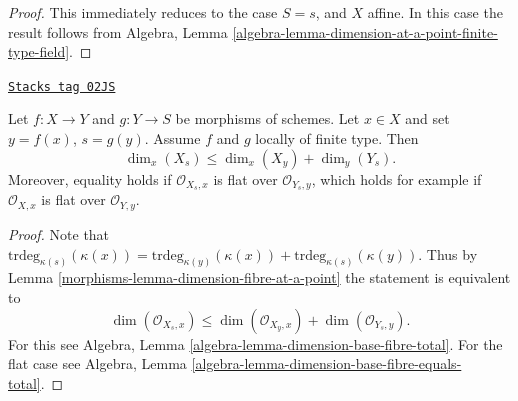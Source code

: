 \begin{proof}
This immediately reduces to the case $S = s$, and $X$ affine.
In this case the result follows from
Algebra, Lemma \ref{algebra-lemma-dimension-at-a-point-finite-type-field}.
\end{proof}

\begin{lemma}
\label{morphisms-lemma-dimension-fibre-at-a-point-additive}
\href{https://stacks.math.columbia.edu/tag/02JS}{\texttt{Stacks tag 02JS}}

Let $f : X \to Y$ and $g : Y \to S$ be morphisms of schemes.
Let $x \in X$ and set $y = f(x)$, $s = g(y)$.
Assume $f$ and $g$ locally of finite type.
Then
$$
\dim_x(X_s) \leq \dim_x(X_y) + \dim_y(Y_s).
$$
Moreover, equality holds if $\mathcal{O}_{X_s, x}$ is flat
over $\mathcal{O}_{Y_s, y}$, which holds for example if $\mathcal{O}_{X, x}$
is flat over $\mathcal{O}_{Y, y}$.
\end{lemma}

\begin{proof}

Note that $\text{trdeg}_{\kappa(s)}(\kappa(x)) =
\text{trdeg}_{\kappa(y)}(\kappa(x)) + \text{trdeg}_{\kappa(s)}(\kappa(y))$.
Thus by Lemma \ref{morphisms-lemma-dimension-fibre-at-a-point} the statement
is equivalent to
$$
\dim(\mathcal{O}_{X_s, x})
\leq
\dim(\mathcal{O}_{X_y, x}) + \dim(\mathcal{O}_{Y_s, y}).
$$
For this see Algebra, Lemma \ref{algebra-lemma-dimension-base-fibre-total}.
For the flat case see
Algebra, Lemma \ref{algebra-lemma-dimension-base-fibre-equals-total}.
\end{proof}

